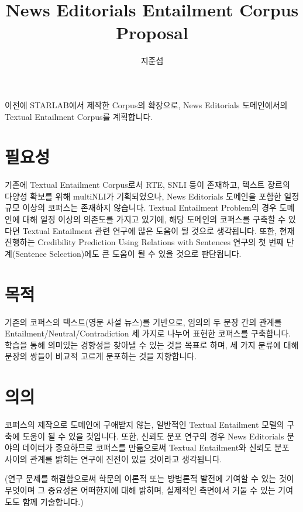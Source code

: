 \documentclass{article}
\author{지준섭}
\title{News Editorials Entailment Corpus Proposal}
\begin{document}
\maketitle
이전에 STARLAB에서 제작한 Corpus\cite{credcorpus}의 확장으로,
News Editorials 도메인에서의 Textual Entailment Corpus를 계획합니다.

\section{필요성}
기존에 Textual Entailment Corpus로서 RTE, SNLI\cite{snli:emnlp2015} 등이 존재하고,
텍스트 장르의 다양성 확보를 위해 multiNLI\cite{multinli}가 기획되었으나,
News Editorials 도메인을 포함한 일정 규모 이상의 코퍼스는 존재하지 않습니다.
Textual Entailment Problem의 경우 도메인에 대해 일정 이상의 의존도를 가지고 있기에,
해당 도메인의 코퍼스를 구축할 수 있다면 Textual Entailment 관련 연구에
많은 도움이 될 것으로 생각됩니다.
또한, 현재 진행하는 Credibility Prediction Using Relations with Sentences 연구의
첫 번째 단계(Sentence Selection)에도 큰 도움이 될 수 있을 것으로 판단됩니다.

\section{목적}
기존의 코퍼스의 텍스트(영문 사설 뉴스)를 기반으로, 임의의 두 문장 간의 관계를
Entailment/Neutral/Contradiction 세 가지로 나누어 표현한 코퍼스를 구축합니다.
학습을 통해 의미있는 경향성을 찾아낼 수 있는 것을 목표로 하며,
세 가지 분류에 대해 문장의 쌍들이 비교적 고르게 분포하는 것을 지향합니다.

\section{의의}
코퍼스의 제작으로 도메인에 구애받지 않는,
일반적인 Textual Entailment 모델의 구축에 도움이 될 수 있을 것입니다.
또한, 신뢰도 분포 연구의 경우 News Editorials 분야의 데이터가 중요하므로
코퍼스를 만듦으로써 Textual Entailment와 신뢰도 분포 사이의 관계를 밝히는 연구에
진전이 있을 것이라고 생각됩니다.

(연구 문제를 해결함으로써
학문의 이론적 또는 방법론적 발전에 기여할 수 있는 것이
무엇이며 그 중요성은 어떠한지에 대해 밝히며,
실제적인 측면에서 거둘 수 있는 기여도도 함께 기술합니다.)
\end{document}
